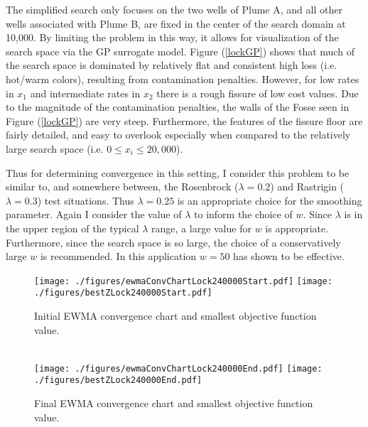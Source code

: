 \documentclass[12pt]{article}
\begin{document}
	The simplified search only focuses on the two wells of Plume A, and all other wells associated with Plume B, are fixed in the center of the search domain at 10,000. 
	By limiting the problem in this way, it allows for visualization of the search space via the GP surrogate model.
	Figure (\ref{lockGP}) shows that much of the search space is dominated by relatively flat and consistent high loss (i.e. hot/warm colors), resulting from contamination penalties.
	However, for low rates in $x_1$ and intermediate rates in $x_2$ there is a rough fissure of low cost values.
	Due to the magnitude of the contamination penalties, the walls of the Fosse seen in Figure (\ref{lockGP}) are very steep.
	Furthermore, the features of the fissure floor are fairly detailed, and easy to overlook especially when compared to the relatively large search space (i.e. \mbox{$0\le x_i\le20,000$}).
	
	\clearpage
	
	Thus for determining convergence in this setting, I consider this problem to be similar to, and somewhere between, the Rosenbrock ($\lambda=0.2$) and Rastrigin ($\lambda=0.3$) test situations.
	Thus $\lambda=0.25$ is an appropriate choice for the smoothing parameter.
	Again I consider the value of $\lambda$ to inform the choice of $w$.
	Since $\lambda$ is in the upper region of the typical $\lambda$ range, a large value for $w$ is appropriate.
	Furthermore, since the search space is so large, the choice of a conservatively large $w$ is recommended.
	In this application $w=50$ has shown to be effective. 
	

	\begin{wrapfigure}{l}{0.5\textwidth}
	\texttt{[image: ./figures/ewmaConvChartLock240000Start.pdf]}
	\texttt{[image: ./figures/bestZLock240000Start.pdf]}
	\caption{Initial EWMA convergence chart and smallest objective function value. }
	\label{lock2EWMAStart}
	$~$\\\\
	\texttt{[image: ./figures/ewmaConvChartLock240000End.pdf]}
	\texttt{[image: ./figures/bestZLock240000End.pdf]}
	\caption{Final EWMA convergence chart and smallest objective function value. }
	\label{lock2EWMAEnd}
	\end{wrapfigure}
	
\end{document}
